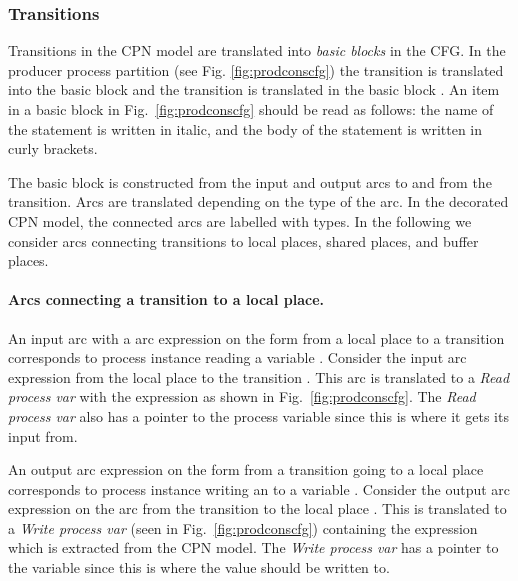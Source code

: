 \subsubsection{Transitions}
Transitions in the CPN model are translated into \emph{basic blocks} in the CFG. In the producer process partition (see Fig. \ref{fig:prodconscfg}) the transition  is translated into the basic block  and the transition  is translated in the basic block . An item in a basic block in Fig.~\ref{fig:prodconscfg} should be read as follows: the name of the statement is written in italic, and the body of the statement is written in curly brackets. 

The basic block is constructed from the input and output arcs to and from the transition. Arcs are translated depending on the type of the arc. In the decorated CPN model, the connected arcs are labelled with types. In the following we consider arcs connecting transitions to local places, shared places, and buffer places.

\paragraph*{Arcs connecting a transition to a local place.}
An input arc with a arc expression on the form  from a local place to a transition corresponds to process instance  reading a variable . Consider the input arc expression  from the local place  to the transition . This arc is translated to a \emph{Read process var} with the expression  as shown in Fig.~\ref{fig:prodconscfg}. The \emph{Read process var} also has a pointer to the process variable  since this is where it gets its input from.

An output arc expression on the form  from a transition going to a local place corresponds to process instance  writing an  to a variable . Consider the output arc expression on the arc from the transition  to the local place . This is translated to a \emph{Write process var} (seen in Fig.~\ref{fig:prodconscfg}) containing the expression  which is extracted from the CPN model. The \emph{Write process var} has a pointer to the variable  since this is where the value should be written to.

